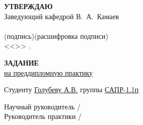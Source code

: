 \begin{titlepage}
    \begin{flushright}
        \textbf{\MakeUppercase{Утверждаю}}\hspace{4.5cm}~\\
        Заведующий кафедрой В.~А.~Камаев \\
        \underline{\hspace{3.2cm}} \underline{\hspace{4.5cm}}\\
        \vspace{-0.2cm}\footnotesize(подпись)\hspace{1.4cm}(расшифровка подписи)\hspace{0.4cm}~\normalsize\\
        <<\underline{\hspace{2cm}}>>\underline{\hspace{4cm}} \the{}.
    \end{flushright}
    \vspace{1cm}
    \begin{center}
        \textbf{\MakeUppercase{Задание}}\\
        \underline{на преддипломную практику}
    \end{center}
    \vspace{1cm}
    Студенту \underline{Голубеву А.В.} группы \underline{САПР-1.1п}\\
    \underline{\hspace{\textwidth}}
    \underline{\hspace{\textwidth}}
    \underline{\hspace{\textwidth}}
    \underline{\hspace{\textwidth}}
    \underline{\hspace{\textwidth}}
    \underline{\hspace{\textwidth}}
    \underline{\hspace{\textwidth}}
    \underline{\hspace{\textwidth}}
    \underline{\hspace{\textwidth}}
    \underline{\hspace{\textwidth}}
    \vspace{\fill}
    \begin{flushright}
        Научный руководитель \underline{\hspace{5cm}} / \underline{\hspace{3cm}}\\
        Руководитель практики \underline{\hspace{5cm}} / \underline{\hspace{3cm}}
    \end{flushright}
\end{titlepage}